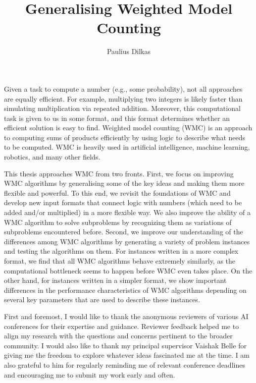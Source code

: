 \documentclass[phd,aiai,twoside,fullspacing,logo]{infthesis}
\title{Generalising Weighted Model Counting}
\author{Paulius Dilkas}
\theoremstyle{definition}
\theoremstyle{remark}
\numberwithin{claim}{chapter}
\numberwithin{assumption}{chapter}
\numberwithin{conjecture}{chapter}
\numberwithin{constraint}{chapter}
\numberwithin{fact}{chapter}
\numberwithin{proposition}{chapter}
\numberwithin{theorem}{chapter}
\numberwithin{lemma}{chapter}
\numberwithin{definition}{chapter}
\numberwithin{example}{chapter}
\numberwithin{experiment}{chapter}
\begin{document}
\nobibliography*

\begin{preliminary}

\maketitle

\begin{laysummary}
  Given a task to compute a number (e.g., some probability), not all approaches
  are equally efficient. For example, multiplying two integers is likely faster
  than simulating multiplication via repeated addition. Moreover, this
  computational task is given to us in some format, and this format determines
  whether an efficient solution is easy to find. Weighted model counting (WMC)
  is an approach to computing sums of products efficiently by using logic to
  describe what needs to be computed. WMC is heavily used in artificial
  intelligence, machine learning, robotics, and many other fields.

  This thesis approaches WMC from two fronts. First, we focus on improving WMC
  algorithms by generalising some of the key ideas and making them more flexible
  and powerful. To this end, we revisit the foundations of WMC and develop new
  input formats that connect logic with numbers (which need to be added and/or
  multiplied) in a more flexible way. We also improve the ability of a WMC
  algorithm to solve subproblems by recognizing them as variations of
  subproblems encountered before. Second, we improve our understanding of the
  differences among WMC algorithms by generating a variety of problem instances
  and testing the algorithms on them. For instances written in a more complex
  format, we find that all WMC algorithms behave extremely similarly, as the
  computational bottleneck seems to happen before WMC even takes place. On the
  other hand, for instances written in a simpler format, we show important
  differences in the performance characteristics of WMC algorithms depending on
  several key parameters that are used to describe these instances.
\end{laysummary}

\begin{acknowledgements}
  First and foremost, I would like to thank the anonymous reviewers of various
  AI conferences for their expertise and guidance. Reviewer feedback helped me
  to align my research with the questions and concerns pertinent to the broader
  community. I would also like to thank my principal supervisor Vaishak Belle
  for giving me the freedom to explore whatever ideas fascinated me at the time.
  I am also grateful to him for regularly reminding me of relevant conference
  deadlines and encouraging me to submit my work early and often.


\end{acknowledgements}
\end{preliminary}
\end{document}

